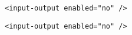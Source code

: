 \begin{verbatim}
<input-output enabled="no" />
\end{verbatim}
\begin{verbatim}
<input-output enabled="no" />
\end{verbatim}
